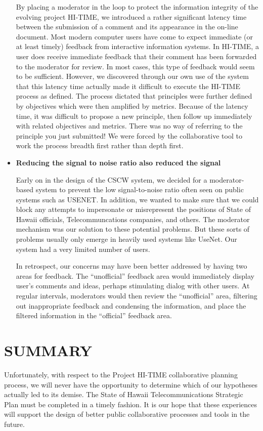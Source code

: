 \begin{itemize}
By placing a moderator in the loop to protect the information integrity of
the evolving project HI-TIME, we introduced a rather significant latency
time between the submission of a comment and its appearance in the on-line
document.  Most modern computer users have come to expect
immediate (or at least timely) feedback from interactive information
systems.  In HI-TIME, a user does receive immediate feedback that their
comment has been forwarded to the moderator for review.  In most cases,
this type of feedback would seem to be sufficient. However, we discovered
through our own use of the system that this latency time actually made it
difficult to execute the HI-TIME process as defined.  The process dictated
that principles were further defined by objectives which were then
amplified by metrics.  Because of the latency time, it was difficult to
propose a new principle, then follow up immediately with related objectives
and metrics.  There was no way of referring to the principle you just
submitted!  We were forced by the collaborative tool to work the process
breadth first rather than depth first.  

\item {\bf Reducing the signal to noise ratio also reduced the signal}

Early on in the design of the CSCW system, we decided for a moderator-based
system to prevent the low signal-to-noise ratio often seen on public
systems such as USENET. In addition, we wanted to make sure that we could
block any attempts to impersonate or misrepresent the positions of State of
Hawaii officials, Telecommuncations companies, and others.  The moderator
mechanism was our solution to these potential problems.  But these sorts of
problems usually only emerge in heavily used systems like UseNet.  Our
system had a very limited number of users.

In retrospect, our concerns may have been better addressed by having two
areas for feedback.  The ``unofficial'' feedback area would immediately
display user's comments and ideas, perhaps stimulating dialog with other
users.  At regular intervals, moderators would then review the ``unofficial''
area, filtering out inappropriate feedback and condensing the information,
and place the filtered information in the ``official'' feedback area.


\end{itemize}

\section{SUMMARY}

Unfortunately, with respect to the Project HI-TIME collaborative planning
process, we will never have the opportunity to determine which of our
hypotheses actually led to its demise. The State of Hawaii
Telecommunications Strategic Plan must be completed in a timely fashion.
It is our hope that these experiences will support the design of better
public collaborative processes and tools in the future.

